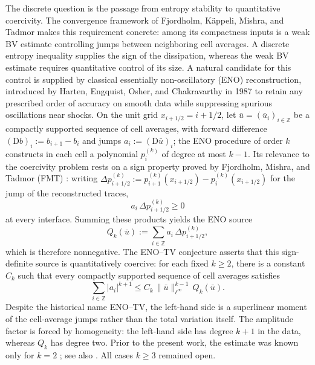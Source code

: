 \documentclass[11pt]{amsart}
\theoremstyle{plain}
\theoremstyle{definition}
\theoremstyle{remark}
\numberwithin{equation}{section}
\theoremstyle{plain}
\begin{document}
The discrete question is the passage from entropy stability to
quantitative coercivity.  
The convergence framework of Fjordholm, K\"appeli, Mishra, and Tadmor
\cite{FKMT} makes this requirement concrete: among its compactness
inputs is a weak BV estimate controlling jumps between neighboring
cell averages.  A discrete
entropy inequality supplies the sign of the dissipation, whereas the
weak BV estimate requires quantitative control of its size. 
A natural candidate for this control is supplied by classical
essentially non-oscillatory (ENO) reconstruction, 
 introduced by Harten, Engquist, Osher, and
Chakravarthy \cite{Harten} in 1987 to retain any prescribed order of accuracy on
smooth data while suppressing spurious oscillations near shocks. On the unit grid $x_{i+1/2}=i+1/2$, let
$\bar u=(\bar u_i)_{i\in\mathbb Z}$ be a compactly supported sequence
of cell averages, with forward difference $(\mathrm Db)_i:=b_{i+1}-b_i$
and jumps $a_i:=(\mathrm D\bar u)_i$; the ENO procedure of order $k$
constructs in each cell a polynomial $p_i^{(k)}$ of degree at most
$k-1$.  Its relevance to the coercivity problem rests on a sign
property proved by Fjordholm, Mishra, and Tadmor (FMT) \cite{FMT}: writing
$\Delta p_{i+1/2}^{(k)}:=p_{i+1}^{(k)}(x_{i+1/2})-p_i^{(k)}(x_{i+1/2})$
for the jump of the reconstructed traces,
\begin{equation}\label{eq:intro-sign-property}
a_i\,\Delta p_{i+1/2}^{(k)}\ge0
\end{equation}
at every interface.  Summing these products yields the ENO source
\begin{equation}\label{eq:intro-Qk}
Q_k(\bar u):=\sum_{i\in\mathbb Z} a_i\,\Delta p_{i+1/2}^{(k)},
\end{equation}
which is therefore nonnegative.  The ENO--TV conjecture \cite{FjordholmHandbook} asserts that
this sign-definite source is quantitatively coercive: for each fixed
$k\ge2$, there is a constant $C_k$ such that every compactly supported
sequence of cell averages satisfies
\begin{equation}\label{eq:full-enotv-intro}
\sum_{i\in\mathbb Z}|a_i|^{k+1}
\le C_k\,\|\bar u\|_{\ell^\infty}^{k-1}\,Q_k(\bar u).
\end{equation}
Despite the historical name ENO--TV, the left-hand side is a
superlinear moment of the cell-average jumps rather than the total
variation itself.  The amplitude factor is forced by homogeneity: the
left-hand side has degree $k+1$ in the data, whereas $Q_k$ has degree
two.  Prior to the present work, the estimate was known only for
$k=2$ \cite[Section~4.4]{FjordholmHandbook}; see also 
\cite[(2.16)]{CFM2AN}.  All cases $k\ge3$ remained
open.  
\end{document}
